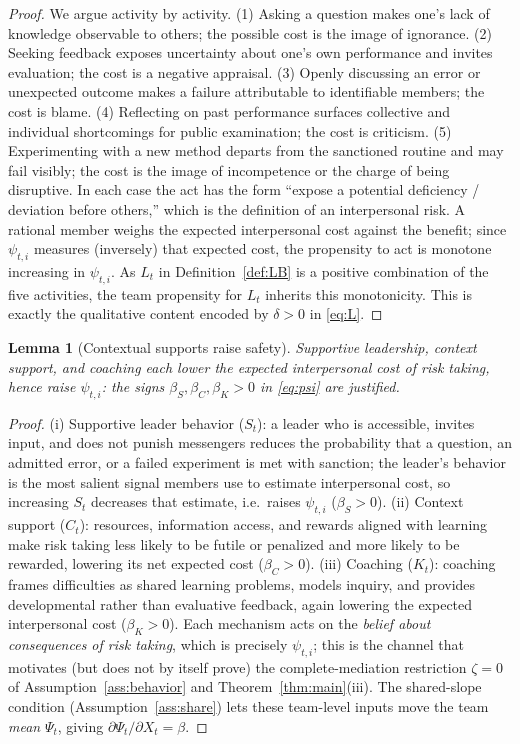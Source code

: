 \documentclass{amsart}
\newtheorem{lemma}{Lemma}
\theoremstyle{definition}
\theoremstyle{remark}
\begin{document}
\begin{proof}
We argue activity by activity. (1) Asking a question makes one's lack of
knowledge observable to others; the possible cost is the image of
ignorance. (2) Seeking feedback exposes uncertainty about one's own
performance and invites evaluation; the cost is a negative appraisal. (3)
Openly discussing an error or unexpected outcome makes a failure
attributable to identifiable members; the cost is blame. (4) Reflecting on
past performance surfaces collective and individual shortcomings for
public examination; the cost is criticism. (5) Experimenting with a new
method departs from the sanctioned routine and may fail visibly; the cost
is the image of incompetence or the charge of being disruptive. In each
case the act has the form ``expose a potential deficiency / deviation
before others,'' which is the definition of an interpersonal risk. A
rational member weighs the expected interpersonal cost against the benefit;
since $\psi_{t,i}$ measures (inversely) that expected cost, the propensity
to act is monotone increasing in $\psi_{t,i}$. As $L_t$ in
Definition~\ref{def:LB} is a positive combination of the five activities,
the team propensity for $L_t$ inherits this monotonicity. This is exactly
the qualitative content encoded by $\delta>0$ in \eqref{eq:L}.
\end{proof}

\begin{lemma}[Contextual supports raise safety]\label{lem:supports}
Supportive leadership, context support, and coaching each lower the
expected interpersonal cost of risk taking, hence raise $\psi_{t,i}$:
the signs $\beta_S,\beta_C,\beta_K>0$ in \eqref{eq:psi} are justified.
\end{lemma}

\begin{proof}
(i) Supportive leader behavior ($S_t$): a leader who is accessible,
invites input, and does not punish messengers reduces the probability that
a question, an admitted error, or a failed experiment is met with
sanction; the leader's behavior is the most salient signal members use to
estimate interpersonal cost, so increasing $S_t$ decreases that estimate,
i.e.\ raises $\psi_{t,i}$ ($\beta_S>0$). (ii) Context support ($C_t$):
resources, information access, and rewards aligned with learning make risk
taking less likely to be futile or penalized and more likely to be
rewarded, lowering its net expected cost ($\beta_C>0$). (iii) Coaching
($K_t$): coaching frames difficulties as shared learning problems, models
inquiry, and provides developmental rather than evaluative feedback, again
lowering the expected interpersonal cost ($\beta_K>0$). Each mechanism acts
on the \emph{belief about consequences of risk taking}, which is precisely
$\psi_{t,i}$; this is the channel that motivates (but does not by itself
prove) the complete-mediation restriction $\zeta=0$ of
Assumption~\ref{ass:behavior} and Theorem~\ref{thm:main}(iii). The
shared-slope condition
(Assumption~\ref{ass:share}) lets these team-level inputs move the team
\emph{mean} $\Psi_t$, giving $\partial \Psi_t/\partial X_t=\beta$.
\end{proof}
\end{document}

